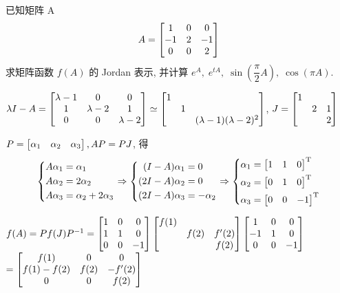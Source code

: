 \documentclass{matrix-homework}
\begin{document}
\newcommand{\la}{\lambda}
\newcommand{\al}{\alpha}

\section{}
已知矩阵 A
$$A=\begin{bmatrix}1&0&0\\ -1&2&-1\\ 0&0&2\end{bmatrix}$$
求矩阵函数 $f(A)$ 的 Jordan 表示, 并计算 $e^A,\; e^{tA},\; \sin\left(\dfrac{\pi}{2}A\right),\; \cos(\pi A)$.

\answer
$\la I -A=\mat{\la-1&0&0\\1&\la-2&1\\0&0&\la-2}\simeq\mat{1\\&1\\&&(\la-1)(\la-2)^2}$, $J=\begin{bmatrix}1\\&2&1\\&&2\end{bmatrix}$

$P=\mat{\al_1&\al_2&\al_3}, AP=PJ$, 得
\begin{equation*}
    \left\{
    \begin{aligned}
        A\al_1 & = \al_1          \\
        A\al_2 & = 2\al_2         \\
        A\al_3 & = \al_2 + 2\al_3
    \end{aligned}
    \right.
    \Rightarrow
    \left\{
    \begin{aligned}
        (I-A)\al_1  & = 0       \\
        (2I-A)\al_2 & = 0       \\
        (2I-A)\al_3 & = - \al_2
    \end{aligned}
    \right.
    \Rightarrow
    \left\{
    \begin{aligned}
        \al_1 & =\mat{1 & 1 & 0}^\TT  \\
        \al_2 & =\mat{0 & 1 & 0}^\TT  \\
        \al_3 & =\mat{0 & 0 & -1}^\TT
    \end{aligned}
    \right.
\end{equation*}

$f(A)=Pf(J)P^{-1}=\begin{bmatrix}1&0&0\\1&1&0\\0&0&-1\end{bmatrix} \begin{bmatrix}f(1)\\&f(2)&f'(2)\\&&f(2)\end{bmatrix} \begin{bmatrix}1&0&0\\-1&1&0\\0&0&-1\end{bmatrix}$\\
$ = \begin{bmatrix}f(1)&0&0\\f(1)-f(2)&f(2)&-f'(2)\\0&0&f(2)\end{bmatrix}$
\\[3em]
\end{document}
